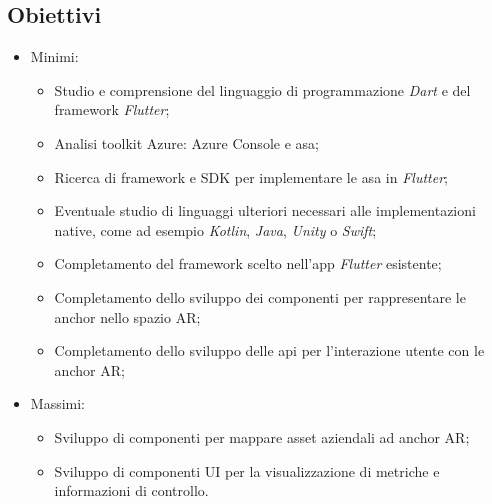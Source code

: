 \subsection{Obiettivi}
\begin{itemize}
    \item Minimi:
        \begin{itemize}
            \item Studio e comprensione del linguaggio di programmazione \textit    {Dart} e del \gls{framework} \textit{Flutter};
            \item Analisi toolkit Azure: Azure Console e \gls{asa};
            \item Ricerca di \gls{framework} e \gls{SDK} per implementare le \gls   {asa} in \textit{Flutter};
            \item Eventuale studio di linguaggi ulteriori necessari alle    implementazioni native, come ad esempio \textit{Kotlin}, \textit{Java},    \textit{Unity} o \textit{Swift};
            \item Completamento del \gls{framework} scelto nell'app \textit{Flutter}    esistente;
            \item Completamento dello sviluppo dei componenti per rappresentare le \Gls{anchor} nello spazio AR;
            \item Completamento dello sviluppo delle \acrshort{api} per l'interazione utente con le \Gls{anchor} AR;
        \end{itemize}
    \item Massimi: 
        \begin{itemize}
            \item Sviluppo di componenti per mappare \gls{asset} aziendali ad \Gls{anchor} AR;
            \item Sviluppo di componenti UI per la visualizzazione di metriche e informazioni di controllo.
        \end{itemize}
\end{itemize}



